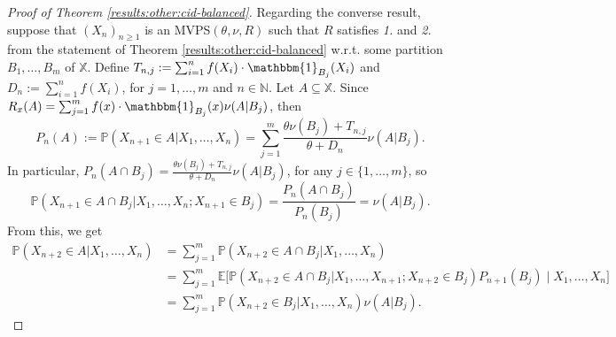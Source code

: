 \documentclass[a4paper]{article}
\theoremstyle{plain}
\theoremstyle{remark}
\theoremstyle{definition}
\begin{document}
\begin{proof}[Proof of Theorem \ref{results:other:cid-balanced}]
Regarding the converse result, suppose that $(X_n)_{n\geq1}$ is an MVPS$(\theta,\nu,R)$ such that $R$ satisfies \textit{1.} and \textit{2.} from the statement of Theorem \ref{results:other:cid-balanced} w.r.t. some partition $B_1,\ldots,B_m$ of $\mathbb{X}$. Define $T_{n,j}:=\sum_{i=1}^nf(X_i)\cdot\mathbbm{1}_{B_j}(X_i)$ and $D_n:=\sum_{i=1}^nf(X_i)$, for $j=1,\ldots,m$ and $n\in\mathbb{N}$. Let $A\subseteq\mathbb{X}$. Since $R_x(A)=\sum_{j=1}^mf(x)\cdot\mathbbm{1}_{B_j}(x)\nu(A|B_j)$, then
\[P_n(A):=\mathbb{P}(X_{n+1}\in A|X_1,\ldots,X_n)=\sum_{j=1}^m\frac{\theta\nu(B_j)+T_{n,j}}{\theta+D_n}\nu(A|B_j).\]
In particular, $P_n(A\cap B_j)=\frac{\theta\nu(B_j)+T_{n,j}}{\theta+D_n}\nu(A|B_j)$, for any $j\in\{1,\ldots,m\}$, so
\[\mathbb{P}(X_{n+1}\in A\cap B_j|X_1,\ldots,X_n;X_{n+1}\in B_j)=\frac{P_n(A\cap B_j)}{P_n(B_j)}=\nu(A|B_j).\]
From this, we get
\begingroup\allowdisplaybreaks
\begin{align}\label{proof:results:other:cid-balanced:eq12}
\mathbb{P}(X_{n+2}\in A|X_1,\ldots,X_n)&=\sum_{j=1}^m\mathbb{P}(X_{n+2}\in A\cap B_j|X_1,\ldots,X_n)\nonumber\\
&=\sum_{j=1}^m\mathbb{E}\bigl[\mathbb{P}(X_{n+2}\in A\cap B_j|X_1,\ldots,X_{n+1};X_{n+2}\in B_j)P_{n+1}(B_j)\mid X_1,\ldots,X_n\bigr]\nonumber\\
&=\sum_{j=1}^m\mathbb{P}(X_{n+2}\in B_j|X_1,\ldots,X_n)\nu(A|B_j).
\end{align}
\endgroup


\end{proof}
\end{document}
